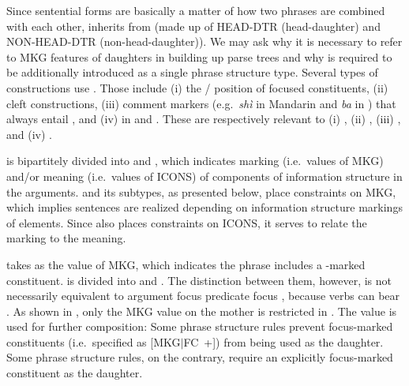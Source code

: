 Since sentential forms are basically a matter of how two phrases are
combined with each other,  inherits
from  (made up of HEAD-DTR (head-daughter)
and NON-HEAD-DTR (non-head-daughter)). We may ask why it is necessary
to refer to MKG features of daughters in building up parse trees and
why  is required to be additionally introduced as a single
phrase structure type.  Several types of constructions use
.  Those include (i) the /
position of focused constituents, (ii) cleft
constructions, (iii) comment markers
(e.g.\ \textit{sh\`{i}} in Mandarin  \citep{prince:12}
and \textit{ba} in  \citep{schneider:09}) that always entail
, and (iv)  in 
and  \citep{choi:99,ishihara:01,song:bender:11}. These are
respectively relevant to (i) , (ii) ,
(iii) , and (iv)  \vs
{}.




 is bipartitely divided into  and
, which indicates marking (i.e.\ values of MKG) and/or
meaning (i.e.\ values of ICONS) of components of information structure
in the arguments.  and
its subtypes, as presented below, place constraints on MKG,
which implies sentences are realized depending on information
structure markings of elements.  Since  also places
constraints on ICONS, it serves to relate the marking to the meaning.


 takes  as the value of MKG, which
indicates the phrase includes a -marked constituent.
 is divided into  and
. The distinction between them, however, is not
necessarily equivalent to argument focus \vs predicate focus
\citep{lambrecht:96,erteschik:07}, because verbs can bear
.  As shown in , only the MKG
value on the mother is restricted in . The value is used
for further composition: Some phrase structure rules prevent
focus-marked constituents (i.e.\ specified as \mbox{[MKG{$\mid$}FC
    +]}) from being used as the daughter. Some phrase structure rules,
on the contrary, require an explicitly focus-marked constituent as the
daughter.


